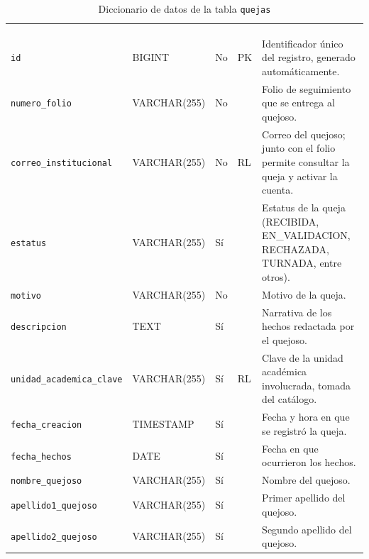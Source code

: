 \footnotesize
\renewcommand{\arraystretch}{1.15}
\setlength{\tabcolsep}{4pt}
\begin{longtable}{|L{3.9cm}|L{2.4cm}|L{0.9cm}|L{1.2cm}|L{6.6cm}|}
	\hiderowcolors\caption{Diccionario de datos de la tabla \texttt{quejas}}
	\label{tab:dic_quejas} \\ \showrowcolors
	\hline
	 &  &  &  &  \\
	\hline
	\endfirsthead
	\hline
	 &  &  &  &  \\
	\hline
	\endhead
		\texttt{id} & BIGINT & No & PK & Identificador único del registro, generado automáticamente. \\ \hline
		\texttt{numero\_\allowbreak{}folio} & VARCHAR(255) & No &  & Folio de seguimiento que se entrega al quejoso. \\ \hline
		\texttt{correo\_\allowbreak{}institucional} & VARCHAR(255) & No & RL & Correo del quejoso; junto con el folio permite consultar la queja y activar la cuenta. \\ \hline
		\texttt{estatus} & VARCHAR(255) & Sí &  & Estatus de la queja (RECIBIDA, EN\_VALIDACION, RECHAZADA, TURNADA, entre otros). \\ \hline
		\texttt{motivo} & VARCHAR(255) & No &  & Motivo de la queja. \\ \hline
		\texttt{descripcion} & TEXT & Sí &  & Narrativa de los hechos redactada por el quejoso. \\ \hline
		\texttt{unidad\_\allowbreak{}academica\_\allowbreak{}clave} & VARCHAR(255) & Sí & RL & Clave de la unidad académica involucrada, tomada del catálogo. \\ \hline
		\texttt{fecha\_\allowbreak{}creacion} & TIMESTAMP & Sí &  & Fecha y hora en que se registró la queja. \\ \hline
		\texttt{fecha\_\allowbreak{}hechos} & DATE & Sí &  & Fecha en que ocurrieron los hechos. \\ \hline
		\texttt{nombre\_\allowbreak{}quejoso} & VARCHAR(255) & Sí &  & Nombre del quejoso. \\ \hline
		\texttt{apellido1\_\allowbreak{}quejoso} & VARCHAR(255) & Sí &  & Primer apellido del quejoso. \\ \hline
		\texttt{apellido2\_\allowbreak{}quejoso} & VARCHAR(255) & Sí &  & Segundo apellido del quejoso. \\ \hline

\end{longtable}
